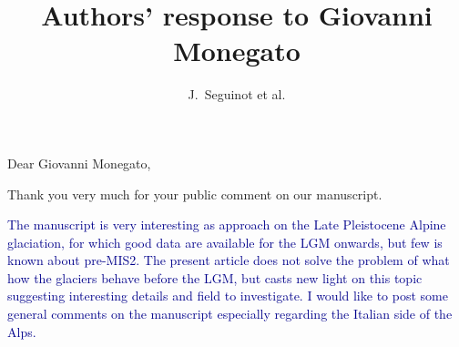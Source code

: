 

\title{Authors' response to Giovanni Monegato}
\author{J.~Seguinot et al.}


\maketitle
\bigskip


\newcommand{\sechead}[1]{\bigskip\noindent\textbf{#1}}
\newcommand{\referee}[1]{\bigskip\noindent\textcolor{darkblue}{#1}}
\newcommand{\msquote}[1]{\begin{quote}\textit{#1}\end{quote}}
\newcommand{\doi}[1]{doi:\allowbreak\href{http://dx.doi.org/#1}{#1}}

Dear Giovanni Monegato,

Thank you very much for your public comment on our manuscript.

    \referee{%
        The manuscript is very interesting as approach on the Late Pleistocene
        Alpine glaciation, for which good data are available for the LGM
        onwards, but few is known about pre-MIS2. The present article does not
        solve the problem of what how the glaciers behave before the LGM, but
        casts new light on this topic suggesting interesting details and field
        to investigate. I would like to post some general comments on the
        manuscript especially regarding the Italian side of the Alps.}


